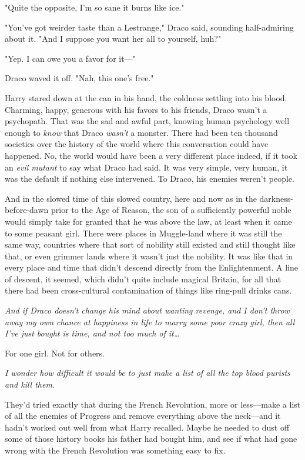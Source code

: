 "Quite the opposite, I'm so sane it burns like ice."

"You've got weirder taste than a Lestrange," Draco said, sounding half-admiring 
about it. "And I suppose you want her all to yourself, huh?"

"Yep. I can owe you a favor for it---"

Draco waved it off. "Nah, this one's free."

Harry stared down at the can in his hand, the coldness settling into his blood. 
Charming, happy, generous with his favors to his friends, Draco wasn't a 
psychopath. That was the sad and awful part, knowing human psychology well 
enough to \emph{know} that Draco \emph{wasn't} a monster. There had been ten 
thousand societies over the history of the world where this conversation could 
have happened. No, the world would have been a very different place indeed, if 
it took an \emph{evil mutant} to say what Draco had said. It was very simple, 
very human, it was the default if nothing else intervened. To Draco, his 
enemies weren't people.

And in the slowed time of this slowed country, here and now as in the 
darkness-before-dawn prior to the Age of Reason, the son of a sufficiently 
powerful noble would simply take for granted that he was above the law, at 
least when it came to some peasant girl. There were places in Muggle-land where 
it was still the same way, countries where that sort of nobility still existed 
and still thought like that, or even grimmer lands where it wasn't just the 
nobility. It was like that in every place and time that didn't descend directly 
from the Enlightenment. A line of descent, it seemed, which didn't quite 
include magical Britain, for all that there had been cross-cultural 
contamination of things like ring-pull drinks cans.

\emph{And if Draco doesn't change his mind about wanting revenge, and I don't 
throw away my own chance at happiness in life to marry some poor crazy girl, 
then all I've just bought is time, and not too much of it{\ldots}}

For one girl. Not for others.

\emph{I wonder how difficult it would be to just make a list of all the top 
blood purists and kill them.}

They'd tried exactly that during the French Revolution, more or less---make a 
list of all the enemies of Progress and remove everything above the neck---and 
it hadn't worked out well from what Harry recalled. Maybe he needed to dust off 
some of those history books his father had bought him, and see if what had gone 
wrong with the French Revolution was something easy to fix.

